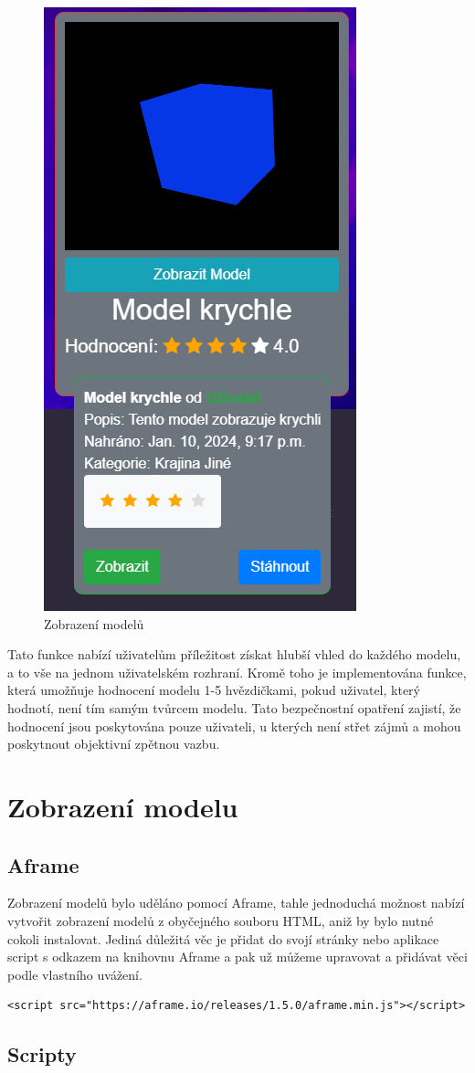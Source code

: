 \documentclass[12pt, a4paper,
twoside,        %
openright
]{report}
\begin{document}
\begin{figure}[h]
			\centering
			\includegraphics[width=0.3\linewidth]{image/model-view.png} 
			\caption{Zobrazení modelů}
		\end{figure}
		
Tato funkce nabízí uživatelům příležitost získat hlubší vhled do každého modelu, a to vše na jednom uživatelském rozhraní. Kromě toho je implementována funkce, která umožňuje hodnocení modelu 1-5 hvězdičkami, pokud uživatel, který hodnotí, není tím samým tvůrcem modelu. Tato bezpečnostní opatření zajistí, že hodnocení jsou poskytována pouze uživateli, u kterých není střet zájmů a mohou poskytnout objektivní zpětnou vazbu.
\newpage
\chapter[Zobrazení modelu]{Zobrazení modelu}
\section[Aframe]{Aframe}
Zobrazení modelů bylo uděláno pomocí Aframe, tahle jednoduchá možnost nabízí vytvořit zobrazení modelů z obyčejného souboru HTML, aniž by bylo nutné cokoli instalovat. Jediná důležitá věc je přidat do svojí stránky nebo aplikace script s odkazem na knihovnu Aframe a pak už můžeme upravovat a přidávat věci podle vlastního uvážení.
\begin{lstlisting}
<script src="https://aframe.io/releases/1.5.0/aframe.min.js"></script>
\end{lstlisting}
\section[Scripty]{Scripty}
\end{document}
